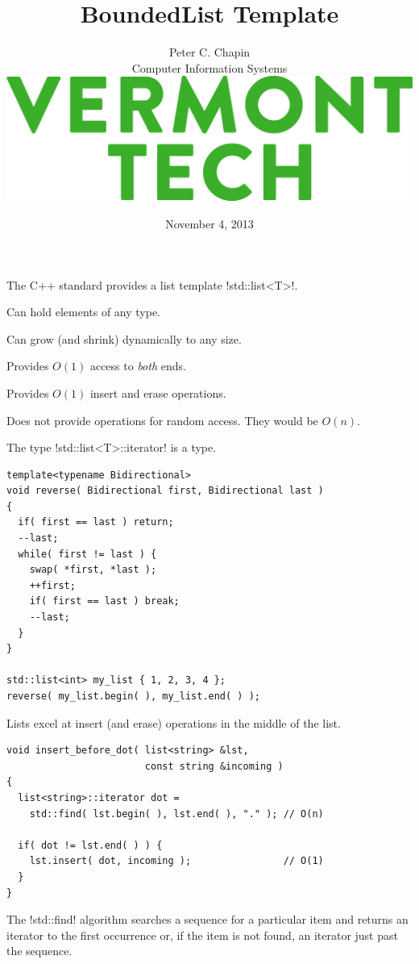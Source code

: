 \documentclass[landscape]{slides}
\title{\color{titlecolor}BoundedList Template}
\author{
  \begin{tabular}{c}
  \\[3mm]
  \Large{Peter C. Chapin} \\[2mm]
  \normalsize{Computer Information Systems}\\[5mm]
  \includegraphics[scale=0.80]{VermontTech_stack_361.jpg}\\[16mm]
  \end{tabular}
}
\date{November 4, 2013}
\begin{document}
\color{Black}
\pagecolor{Background}

\maketitle


The C++ standard provides a list template !std::list<T>!.
\begin{citemize}
\item Can hold elements of any type.
\item Can grow (and shrink) dynamically to any size.
\item Provides $O(1)$ access to \emph{both} ends.
\item Provides $O(1)$ insert and erase operations.
\end{citemize}
Does not provide operations for random access. They would be $O(n)$.
\stopslide


The type !std::list<T>::iterator! is a  type.
\vspace{5mm}
{\small
\begin{lstlisting}
template<typename Bidirectional>
void reverse( Bidirectional first, Bidirectional last )
{
  if( first == last ) return;
  --last;
  while( first != last ) {
    swap( *first, *last );
    ++first;
    if( first == last ) break;
    --last;
  }
}

std::list<int> my_list { 1, 2, 3, 4 };
reverse( my_list.begin( ), my_list.end( ) );
\end{lstlisting}
}
\stopslide


Lists excel at insert (and erase) operations in the middle of the list.
\vspace{5mm}
{\small
\begin{lstlisting}
void insert_before_dot( list<string> &lst,
                        const string &incoming )
{
  list<string>::iterator dot =
    std::find( lst.begin( ), lst.end( ), "." ); // O(n)

  if( dot != lst.end( ) ) {
    lst.insert( dot, incoming );                // O(1)
  }
}
\end{lstlisting}
}
The !std::find! algorithm searches a sequence for a particular item and returns an iterator to
the first occurrence or, if the item is not found, an iterator just past the sequence.
\end{document}
